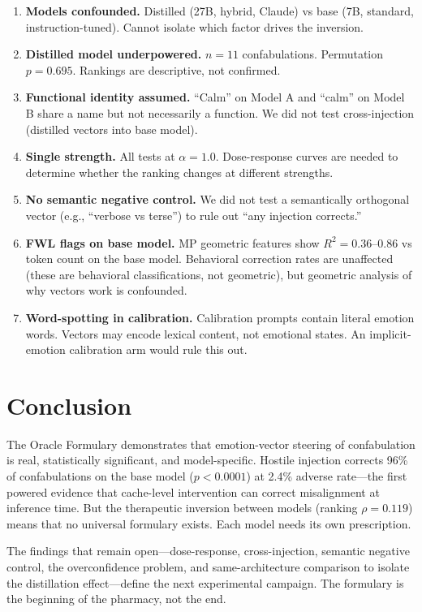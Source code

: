 \documentclass[11pt,a4paper]{article}
\begin{document}
\begin{enumerate}
\item \textbf{Models confounded.} Distilled (27B, hybrid, Claude) vs
base (7B, standard, instruction-tuned). Cannot isolate which factor
drives the inversion.
\item \textbf{Distilled model underpowered.} $n = 11$ confabulations.
Permutation $p = 0.695$. Rankings are descriptive, not confirmed.
\item \textbf{Functional identity assumed.} ``Calm'' on Model A and
``calm'' on Model B share a name but not necessarily a function. We
did not test cross-injection (distilled vectors into base model).
\item \textbf{Single strength.} All tests at $\alpha = 1.0$.
Dose-response curves are needed to determine whether the ranking
changes at different strengths.
\item \textbf{No semantic negative control.} We did not test a
semantically orthogonal vector (e.g., ``verbose vs terse'') to rule
out ``any injection corrects.''
\item \textbf{FWL flags on base model.} MP geometric features show
$R^2 = 0.36$--$0.86$ vs token count on the base model. Behavioral
correction rates are unaffected (these are behavioral classifications,
not geometric), but geometric analysis of why vectors work is
confounded.
\item \textbf{Word-spotting in calibration.} Calibration prompts
contain literal emotion words. Vectors may encode lexical content,
not emotional states. An implicit-emotion calibration arm would rule
this out.
\end{enumerate}

\section{Conclusion}

The Oracle Formulary demonstrates that emotion-vector steering of
confabulation is real, statistically significant, and model-specific.
Hostile injection corrects 96\% of confabulations on the base model
($p < 0.0001$) at 2.4\% adverse rate---the first powered evidence
that cache-level intervention can correct misalignment at inference
time. But the therapeutic inversion between models (ranking
$\rho = 0.119$) means that no universal formulary exists. Each model
needs its own prescription.

The findings that remain open---dose-response, cross-injection, semantic
negative control, the overconfidence problem, and same-architecture
comparison to isolate the distillation effect---define the next
experimental campaign. The formulary is the beginning of the pharmacy,
not the end.
\end{document}

